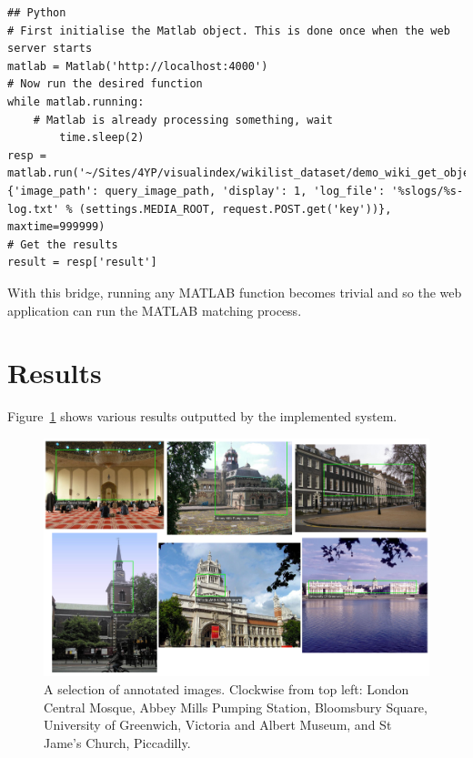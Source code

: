 \documentclass[11pt, onecolumn, a4paper, final]{report} %
\begin{document}
\linespread{1} %
\lstset{language=Python,caption=Python code to run the object matching MATLAB function.,label=lst:pymat}
\begin{lstlisting}[frame=single]
## Python
# First initialise the Matlab object. This is done once when the web server starts
matlab = Matlab('http://localhost:4000')
# Now run the desired function
while matlab.running:
	# Matlab is already processing something, wait
        time.sleep(2)
resp = matlab.run('~/Sites/4YP/visualindex/wikilist_dataset/demo_wiki_get_objects.m', {'image_path': query_image_path, 'display': 1, 'log_file': '%slogs/%s-log.txt' % (settings.MEDIA_ROOT, request.POST.get('key'))}, maxtime=999999)
# Get the results
result = resp['result']
\end{lstlisting}
\linespread{2} %

With this bridge, running any MATLAB function becomes trivial and so the web application can run the MATLAB matching process.

\section{Results}

Figure~\ref{fig:anotations} shows various results outputted by the implemented system.

\begin{figure}[htb]
\centering 
\includegraphics[width=1.0\textwidth]{images/anotatedimages}
\caption{A selection of annotated images. Clockwise from top left: London Central Mosque, Abbey Mills Pumping Station, Bloomsbury Square, University of Greenwich, Victoria and Albert Museum, and St Jame's Church, Piccadilly.}
\label{fig:anotations}
\end{figure}
\end{document}
